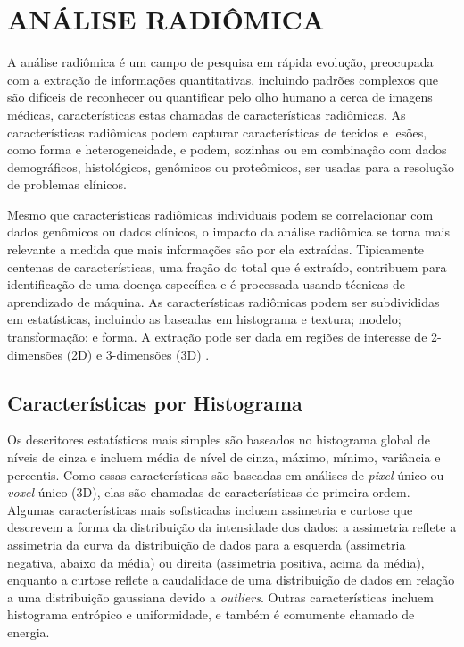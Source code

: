
\section{ANÁLISE RADIÔMICA}
\label{sec:analise_radiomica}

A análise radiômica é um campo de pesquisa em rápida evolução, preocupada com a extração de informações quantitativas, incluindo padrões complexos que são difíceis de reconhecer ou quantificar pelo olho humano a cerca de imagens médicas, características estas chamadas de características radiômicas. As características radiômicas podem capturar características de tecidos e lesões, como forma e heterogeneidade, e podem, sozinhas ou em combinação com dados demográficos, histológicos, genômicos ou proteômicos, ser usadas para a resolução de problemas clínicos.

Mesmo que características radiômicas individuais podem se correlacionar com dados genômicos ou dados clínicos, o impacto da análise radiômica se torna mais relevante a medida que mais informações são por ela extraídas. Tipicamente centenas de características, uma fração do total que é extraído, contribuem para identificação de uma doença específica e é processada usando técnicas de aprendizado de máquina. As características radiômicas podem ser subdivididas em estatísticas, incluindo as baseadas em histograma e textura; modelo; transformação; e forma. A extração pode ser dada em regiões de interesse de 2-dimensões (2D) e 3-dimensões (3D)  \cite{mayerhoeferIntroductionRadiomics2020}.


\subsection{Características por Histograma}

Os descritores estatísticos mais simples são baseados no histograma global de níveis de cinza e incluem média de nível de cinza, máximo, mínimo, variância e percentis. Como essas características são baseadas em análises de \textit{pixel} único ou \textit{voxel} único (3D), elas são chamadas de características de primeira ordem. Algumas características mais sofisticadas incluem assimetria e curtose que descrevem a forma da distribuição da intensidade dos dados: a assimetria reflete a assimetria da curva da distribuição de dados para a esquerda (assimetria negativa, abaixo da média) ou direita (assimetria positiva, acima da média), enquanto a curtose reflete a caudalidade de uma distribuição de dados em relação a uma distribuição gaussiana devido a \textit{outliers}. Outras características incluem histograma entrópico e uniformidade, e também é comumente chamado de energia.

